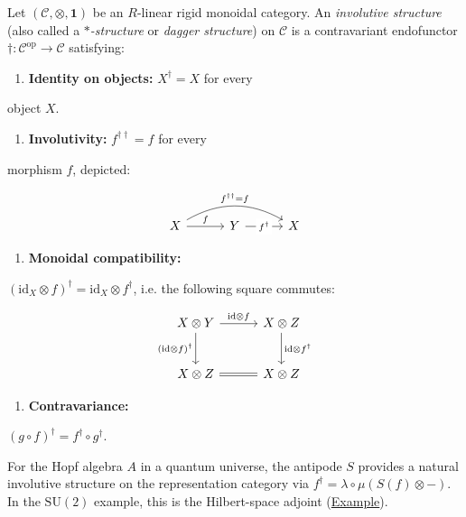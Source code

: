 \begin{definition}
  \label{def:involutive-structure}
Let $(\mathcal{C}, \otimes, \mathbf{1})$ be an $R$-linear rigid monoidal
category. An \emph{involutive structure} (also called a
\emph{$\ast$-structure} or \emph{dagger structure}) on $\mathcal{C}$ is
a contravariant endofunctor
$\dagger \colon \mathcal{C}^{\mathrm{op}} \to \mathcal{C}$ satisfying:

\begin{enumerate}
  \item \textbf{Identity on objects:} $X^{\dagger} = X$ for every
\end{enumerate}
   object $X$.
\begin{enumerate}
  \item \textbf{Involutivity:} $f^{\dagger\dagger} = f$ for every
\end{enumerate}
   morphism $f$, depicted:

   \begin{equation}\label{eq:involutivity-cd}
   \begin{tikzcd}[column sep=3em]
     X \ar[r, "f"] \ar[rr, bend left=30, "f^{\dagger\dagger} = f"]
     & Y \ar[r, "f^{\dagger}"{description}]
     & X
   \end{tikzcd}
   \end{equation}

\begin{enumerate}
  \item \textbf{Monoidal compatibility:}
\end{enumerate}
   $(\mathrm{id}_X \otimes f)^{\dagger}
   = \mathrm{id}_X \otimes f^{\dagger}$, i.e.
   the following square commutes:

   \begin{equation}\label{eq:monoidal-dagger-cd}
   \begin{tikzcd}[row sep=2.5em, column sep=3em]
     X \otimes Y \ar[r, "\mathrm{id} \otimes f"]
       \ar[d, "(\mathrm{id} \otimes f)^{\dagger}"']
     & X \otimes Z \ar[d, "\mathrm{id} \otimes f^{\dagger}"] \\
     X \otimes Z \ar[r, equal]
     & X \otimes Z
   \end{tikzcd}
   \end{equation}

\begin{enumerate}
  \item \textbf{Contravariance:}
\end{enumerate}
   $(g \circ f)^{\dagger} = f^{\dagger} \circ g^{\dagger}$.

For the Hopf algebra $A$ in a quantum universe, the antipode $S$ provides
a natural involutive structure on the representation category via
$f^{\dagger} = \lambda \circ \mu(S(f) \otimes -)$. In the
$\mathrm{SU}(2)$ example, this is the Hilbert-space adjoint
(\hyperref[ex:dagger-su2]{Example}).
\end{definition}

